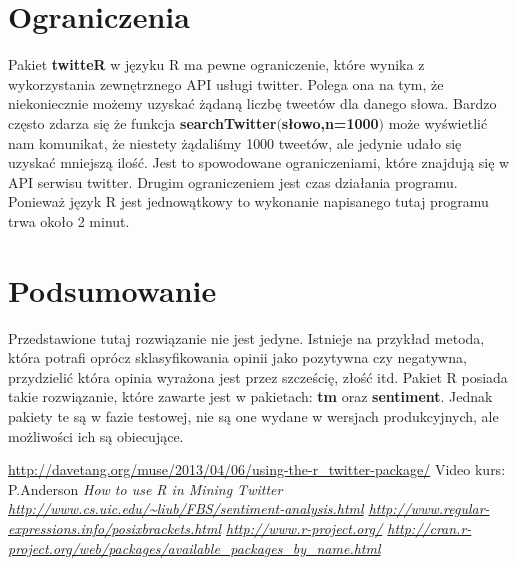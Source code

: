 \documentclass[12pt,a4paper]{article}
\begin{document}
\section[Ograniczenia] {Ograniczenia}
Pakiet \textbf{twitteR} w języku R ma pewne ograniczenie, które wynika z wykorzystania zewnętrznego API usługi twitter. Polega ona na tym, że niekoniecznie możemy uzyskać żądaną liczbę tweetów dla danego słowa. Bardzo często zdarza się że funkcja \textbf{searchTwitter$($słowo,n=1000$)$} może wyświetlić nam komunikat, że niestety żądaliśmy 1000 tweetów, ale jedynie udało się uzyskać mniejszą ilość. Jest to spowodowane ograniczeniami, które znajdują się w API serwisu twitter. Drugim ograniczeniem jest czas działania programu. Ponieważ język R jest jednowątkowy to wykonanie napisanego tutaj programu trwa około 2 minut. 

\section[Podsumowanie] {Podsumowanie}
Przedstawione tutaj rozwiązanie nie jest jedyne. Istnieje na przykład metoda, która potrafi oprócz sklasyfikowania opinii jako pozytywna czy negatywna, przydzielić która opinia wyrażona jest przez szcześcię, złość itd. Pakiet R posiada takie rozwiązanie, które zawarte jest w pakietach: \textbf{tm} oraz \textbf{sentiment}. Jednak pakiety te są w fazie testowej, nie są one wydane w wersjach produkcyjnych, ale możliwości ich są obiecujące. 

\newpage

\begin{thebibliography}{1}
\bibitem{} \url{http://davetang.org/muse/2013/04/06/using-the-r_twitter-package/}  
\bibitem{} Video kurs: P.Anderson \em{How to use R in Mining Twitter}
\bibitem{} \url{http://www.cs.uic.edu/~liub/FBS/sentiment-analysis.html}
\bibitem{} \url{http://www.regular-expressions.info/posixbrackets.html}
\bibitem{} \url{http://www.r-project.org/}
\bibitem{} \url{http://cran.r-project.org/web/packages/available_packages_by_name.html}
\end{thebibliography}
\end{document}
